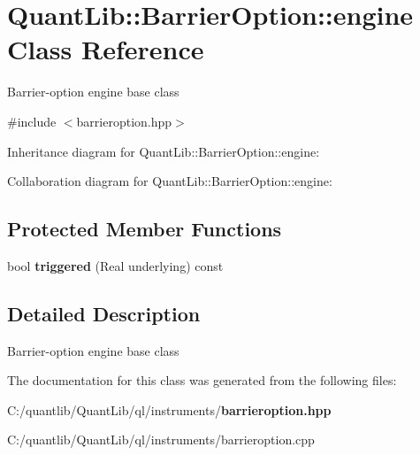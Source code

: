 \section{Quant\+Lib\+:\+:Barrier\+Option\+:\+:engine Class Reference}
\label{class_quant_lib_1_1_barrier_option_1_1engine}


Barrier-\/option engine base class  




{\ttfamily \#include $<$barrieroption.\+hpp$>$}



Inheritance diagram for Quant\+Lib\+:\+:Barrier\+Option\+:\+:engine\+:


Collaboration diagram for Quant\+Lib\+:\+:Barrier\+Option\+:\+:engine\+:
\subsection*{Protected Member Functions}
\begin{DoxyCompactItemize}
\item 
bool {\bfseries triggered} (Real underlying) const \label{class_quant_lib_1_1_barrier_option_1_1engine_a906065bee322e55735efbe555869f25c}

\end{DoxyCompactItemize}


\subsection{Detailed Description}
Barrier-\/option engine base class 

The documentation for this class was generated from the following files\+:\begin{DoxyCompactItemize}
\item 
C\+:/quantlib/\+Quant\+Lib/ql/instruments/{\bf barrieroption.\+hpp}\item 
C\+:/quantlib/\+Quant\+Lib/ql/instruments/barrieroption.\+cpp\end{DoxyCompactItemize}
